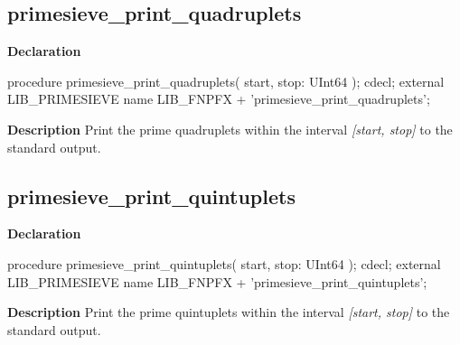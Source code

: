 \documentclass{report}
\newif\ifpdf
\begin{document}
\subsection*{primesieve{\_}print{\_}quadruplets}
\fi
\label{primesieve-primesieve_print_quadruplets}
\begin{list}{}{
\setlength{\itemindent}{0cm}
\setlength{\listparindent}{0cm}
\setlength{\leftmargin}{\evensidemargin}
\addtolength{\leftmargin}{\tmplength}
\settowidth{\labelsep}{X}
\addtolength{\leftmargin}{\labelsep}
\setlength{\labelwidth}{\tmplength}
}
\item[\textbf{Declaration}\hfill]
\ifpdf
\begin{flushleft}
\fi
\begin{ttfamily}
procedure primesieve{\_}print{\_}quadruplets( start, stop: UInt64 ); cdecl; external LIB{\_}PRIMESIEVE name LIB{\_}FNPFX + 'primesieve{\_}print{\_}quadruplets';\end{ttfamily}

\ifpdf
\end{flushleft}
\fi

\par
\item[\textbf{Description}]
Print the prime quadruplets within the interval \textit{[start, stop]} to the standard output.

\end{list}
\ifpdf
\subsection*{\large{\textbf{primesieve{\_}print{\_}quintuplets}}\normalsize\hspace{1ex}\hrulefill}
\else
\subsection*{primesieve{\_}print{\_}quintuplets}
\fi
\label{primesieve-primesieve_print_quintuplets}
\begin{list}{}{
\setlength{\itemindent}{0cm}
\setlength{\listparindent}{0cm}
\setlength{\leftmargin}{\evensidemargin}
\addtolength{\leftmargin}{\tmplength}
\settowidth{\labelsep}{X}
\addtolength{\leftmargin}{\labelsep}
\setlength{\labelwidth}{\tmplength}
}
\item[\textbf{Declaration}\hfill]
\ifpdf
\begin{flushleft}
\fi
\begin{ttfamily}
procedure primesieve{\_}print{\_}quintuplets( start, stop: UInt64 ); cdecl; external LIB{\_}PRIMESIEVE name LIB{\_}FNPFX + 'primesieve{\_}print{\_}quintuplets';\end{ttfamily}

\ifpdf
\end{flushleft}
\fi

\par
\item[\textbf{Description}]
Print the prime quintuplets within the interval \textit{[start, stop]} to the standard output.

\end{list}
\ifpdf
\end{document}
